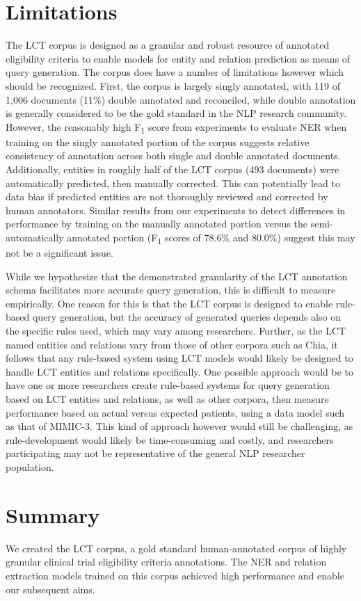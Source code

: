 \documentclass[../main.tex]{subfiles}
\begin{document}
\section{Limitations}
The LCT corpus is designed as a granular and robust resource of annotated eligibility criteria to enable models for entity and relation prediction as means of query generation. The corpus does have a number of limitations however which should be recognized. First, the corpus is largely singly annotated, with 119 of 1,006 documents (11\%) double annotated and reconciled, while double annotation is generally considered to be the gold standard in the NLP research community. However, the reasonably high F\textsubscript{1} score from experiments to evaluate NER when training on the singly annotated portion of the corpus suggests relative consistency of annotation across both single and double annotated documents. Additionally, entities in roughly half of the LCT corpus (493 documents) were automatically predicted, then manually corrected. This can potentially lead to data bias if predicted entities are not thoroughly reviewed and corrected by human annotators. Similar results from our experiments to detect differences in performance by training on the manually annotated portion versus the semi-automatically annotated portion (F\textsubscript{1} scores of 78.6\% and 80.0\%) suggest this may not be a significant issue.

While we hypothesize that the demonstrated granularity of the LCT annotation schema facilitates more accurate query generation, this is difficult to measure empirically. One reason for this is that the LCT corpus is designed to enable rule-based query generation, but the accuracy of generated queries depends also on the specific rules used, which may vary among researchers. Further, as the LCT named entities and relations vary from those of other corpora such as Chia, it follows that any rule-based system using LCT models would likely be designed to handle LCT entities and relations specifically. One possible approach would be to have one or more researchers create rule-based systems for query generation based on LCT entities and relations, as well as other corpora, then measure performance based on actual versus expected patients, using a data model such as that of MIMIC-3. This kind of approach however would still be challenging, as rule-development would likely be time-consuming and costly, and researchers participating may not be representative of the general NLP researcher population.

\section{Summary}
We created the LCT corpus, a gold standard human-annotated corpus of highly granular clinical trial eligibility criteria annotations. The NER and relation extraction models trained on this corpus achieved high performance and enable our subsequent aims.
\end{document}

